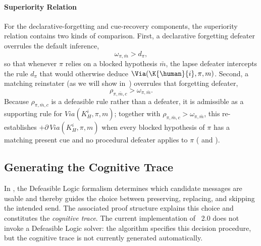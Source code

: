 \paragraph{Superiority Relation} 

For the declarative-forgetting and cue-recovery components, the superiority relation contains two kinds of comparison. First, a declarative forgetting defeater overrules the default inference,
\[
    \omega_{\pi,\bar{m}} > d_{\pi},
\]
so that whenever $\pi$ relies on a blocked hypothesis $\bar{m}$, the lapse defeater intercepts the rule $d_\pi$ that would otherwise deduce $\Via(\K{\human}{i}, \pi, m)$. 
Second, a matching reinstater (as we will show in~) overrules that forgetting defeater,
\[
    \rho_{\pi,\bar m,c}>\omega_{\pi,\bar m}.
\]
Because $\rho_{\pi,\bar m,c}$ is a defeasible rule rather than a defeater, it is admissible as a supporting rule for $\mathit{Via}(K^i_H,\pi,m)$; together with $\rho_{\pi,\bar m,c}>\omega_{\pi,\bar m}$, this re-establishes $+\partial\,\mathit{Via}(K^i_H,\pi,m)$ when every blocked hypothesis of $\pi$ has a matching present cue and no procedural defeater applies to $\pi$ ( and ).

\subsection{Generating the Cognitive Trace}
\label{Subsec:CognitiveTrace}

In , the Defeasible Logic formalism determines which candidate messages are usable and thereby guides the choice between preserving, replacing, and skipping the intended send. The associated proof structure explains this choice and constitutes the \emph{cognitive trace}. The current implementation of \XMen{}~2.0 does not invoke a Defeasible Logic solver: the algorithm specifies this decision procedure, but the cognitive trace is not currently generated automatically.

